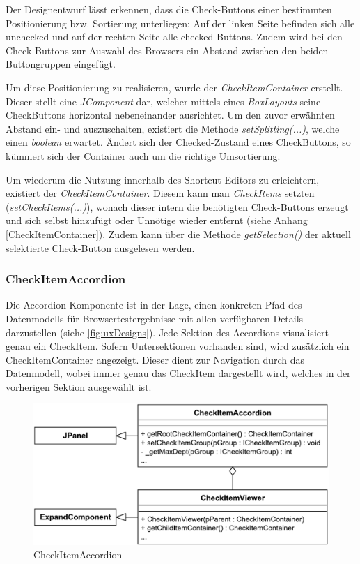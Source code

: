 Der Designentwurf lässt erkennen, dass die Check-Buttons einer bestimmten Positionierung bzw. Sortierung unterliegen: Auf der linken Seite befinden sich alle unchecked und auf der rechten Seite alle checked Buttons. Zudem wird bei den Check-Buttons zur Auswahl des Browsers ein Abstand zwischen den beiden Buttongruppen eingefügt. 

Um diese Positionierung zu realisieren, wurde der \emph{CheckItemContainer} erstellt. Dieser stellt eine \emph{JComponent} dar, welcher mittels eines \emph{BoxLayouts} seine CheckButtons horizontal nebeneinander ausrichtet. Um den zuvor erwähnten Abstand ein- und auszuschalten, existiert die Methode \emph{setSplitting(...)}, welche einen \emph{boolean} erwartet. Ändert sich der Checked-Zustand eines CheckButtons, so kümmert sich der Container auch um die richtige Umsortierung.

Um wiederum die Nutzung innerhalb des Shortcut Editors zu erleichtern, existiert der \emph{CheckItemContainer}. Diesem kann man \emph{CheckItems} setzten (\emph{setCheckItems(...)}), wonach dieser intern die benötigten Check-Buttons erzeugt und sich selbst hinzufügt oder Unnötige wieder entfernt (siehe Anhang \ref{CheckItemContainer}). Zudem kann über die Methode \emph{getSelection()} der aktuell selektierte Check-Button ausgelesen werden.

\subsubsection{CheckItemAccordion}

\vspace{-8px}

Die Accordion-Komponente ist in der Lage, einen konkreten Pfad des Datenmodells für Browsertestergebnisse mit allen verfügbaren Details darzustellen (siehe \autoref{fig:uxDesigns}).
Jede Sektion des Accordions visualisiert genau ein CheckItem. Sofern Untersektionen vorhanden sind, wird zusätzlich ein CheckItemContainer angezeigt. Dieser dient zur Navigation durch das Datenmodell, wobei immer genau das CheckItem dargestellt wird, welches in der vorherigen Sektion ausgewählt ist.

\begin{figure}
	\vspace{-12px}
	\centering
	\includegraphics[width=0.95\linewidth]{../graphic/diagrams/CD_CheckItemAccordion/CheckItemAccordion}
	\caption{CheckItemAccordion}
	\label{fig:checkitemaccordion}
\end{figure}


